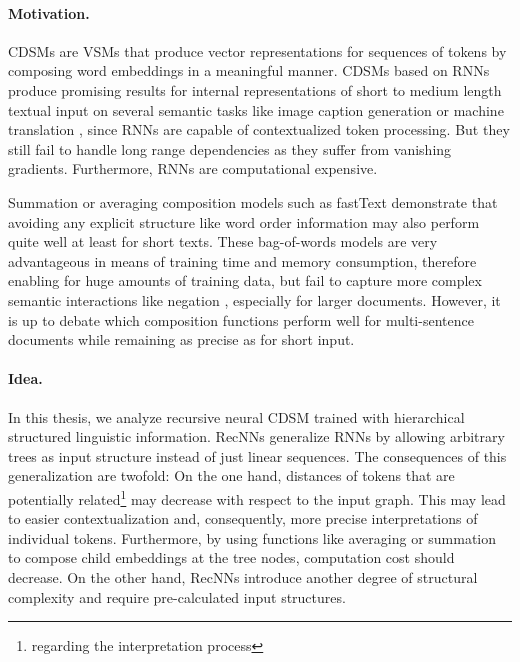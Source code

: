 \paragraph{Motivation.}\acfp{CDSM}\autocite{clark_compositional_2008,grefenstette_experimental_2011} are \acp{VSM} that produce vector representations for sequences of tokens by composing word embeddings in a meaningful manner. \acp{CDSM} based on \acp{RNN}\autocite{hopfield_neural_1982} produce promising results for internal representations of short to medium length textual input on several semantic tasks like image caption generation %
\autocite{vinyals_show_2014} or machine translation \autocite{wu_googles_2016} %
, since \acp{RNN} are capable of contextualized token processing. But they still fail to handle long range dependencies as they suffer from vanishing gradients. %
Furthermore, \acp{RNN} are computational expensive. 

Summation or averaging composition models such as fastText \autocite{joulin_bag_2017} demonstrate that avoiding any explicit structure like word order information %
may also perform quite well at least for short texts. These bag-of-words models are very advantageous in means of training time and memory consumption, therefore enabling for huge amounts of training data, but fail to capture more complex semantic interactions like negation
, especially for larger documents. However, it is up to debate which composition functions perform well for multi-sentence documents while remaining as precise as for short input.%

\paragraph{Idea.}In this thesis, we analyze recursive neural \ac{CDSM} trained with hierarchical structured linguistic information. \acp{RecNN} \autocite{goller_learning_1996,socher_parsing_2011} generalize \acp{RNN} by allowing arbitrary trees as input structure instead of just linear sequences. The consequences of this generalization are twofold: On the one hand, distances of tokens that are potentially related\footnote{regarding the interpretation process} may decrease with respect to the input graph. This may lead to easier contextualization and, consequently, more precise interpretations of individual tokens. Furthermore, by using functions like averaging or summation to compose child embeddings at the tree nodes, computation cost should decrease. On the other hand, \acp{RecNN} introduce another degree of structural complexity and require pre-calculated input structures.%

